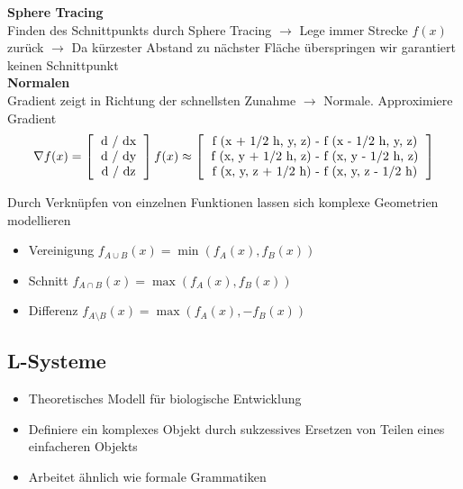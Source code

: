 \documentclass[10pt,a4paper]{article}
\begin{document}
        \textbf{Sphere Tracing}\\
        Finden des Schnittpunkts durch Sphere Tracing $\rightarrow$ Lege immer Strecke $f(x)$ zurück
        $\rightarrow$ Da kürzester Abstand zu nächster Fläche überspringen wir garantiert keinen Schnittpunkt\\

        \textbf{Normalen}\\
        Gradient zeigt in Richtung der schnellsten Zunahme $\rightarrow$ Normale. Approximiere Gradient
        $$\nabla f(x) = \left[
            \begin{tabular}{c}
              d / dx\\
              d / dy \\
              d / dz\\
              \end{tabular}
            \right] f(x)
            \approx
            \left[
              \begin{tabular}{c}
                f (x + 1/2 h, y, z) - f (x - 1/2 h, y, z)\\
                f (x, y + 1/2 h, z) - f (x, y - 1/2 h, z)\\
                f (x, y, z + 1/2 h) - f (x, y, z - 1/2 h)\\
              \end{tabular}
            \right]
          $$

        Durch Verknüpfen von einzelnen Funktionen lassen sich komplexe Geometrien modellieren
        \begin{itemize}
                \item Vereinigung $f_{A \cup B} (x) = \min (f_A(x), f_B(x))$
                \item Schnitt $f_{A \cap B} (x) = \max (f_A(x), f_B(x))$
                \item Differenz $f_{A \setminus B} (x) = \max (f_A(x), - f_B(x))$
        \end{itemize}
        
        \subsection{L-Systeme}
        \label{pm:sub:l_systeme}
        \begin{itemize}
	        \item Theoretisches Modell für biologische Entwicklung
	        \item Definiere ein komplexes Objekt durch sukzessives Ersetzen von Teilen eines einfacheren Objekts
	        \item Arbeitet ähnlich wie formale Grammatiken
        \end{itemize}
        
\end{document}

